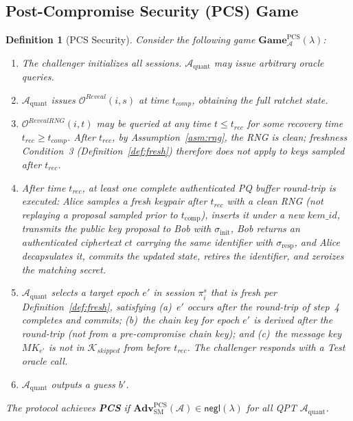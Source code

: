 \documentclass[11pt,a4paper]{article}
\newtheorem{definition}[theorem]{Definition}
\theoremstyle{remark}
\theoremstyle{plain}
\newcommand{\negl}{\mathsf{negl}}
\newcommand{\Adv}{\mathbf{Adv}}
\newcommand{\PGame}{\mathbf{Game}}
\newcommand{\calA}{\mathcal{A}}
\newcommand{\calO}{\mathcal{O}}
\begin{document}
\subsection{Post-Compromise Security (PCS) Game}

\begin{definition}[PCS Security]
\label{def:pcs}
Consider the following game $\PGame^{\mathrm{PCS}}_{\calA}(\lambda)$:
\begin{enumerate}
  \item The challenger initializes all sessions.  $\calA_{\mathrm{quant}}$ may issue arbitrary
        oracle queries.
  \item $\calA_{\mathrm{quant}}$ issues $\calO^{Reveal}(i, s)$ at time $t_{comp}$, obtaining
        the full ratchet state.
  \item $\calO^{RevealRNG}(i, t)$ may be queried at any time $t \leq t_{rec}$ for some
        recovery time $t_{rec} \geq t_{comp}$.  After $t_{rec}$, by Assumption~\ref{asm:rng},
        the RNG is clean; freshness Condition~3 (Definition~\ref{def:fresh}) therefore does not
        apply to keys sampled after $t_{rec}$.
  \item After time $t_{rec}$, at least one complete authenticated PQ buffer round-trip is
        executed: Alice samples a fresh keypair after $t_{rec}$ with a clean RNG (not replaying a proposal sampled prior to $t_{\mathrm{comp}}$), inserts it under a new $kem\_id$, transmits the
        public key proposal to Bob with $\sigma_{\mathrm{init}}$, Bob returns an authenticated ciphertext $ct$ carrying the same identifier with $\sigma_{\mathrm{resp}}$, and Alice
        decapsulates it, commits the updated state, retires the identifier, and zeroizes the matching secret.
  \item $\calA_{\mathrm{quant}}$ selects a target epoch $e'$ in session $\pi^s_i$ that is fresh per Definition~\ref{def:fresh}, satisfying
        (a)~$e'$ occurs after the round-trip of step~4 completes and commits; (b)~the chain key for epoch
        $e'$ is derived \emph{after} the round-trip (not from a pre-compromise chain key); and
        (c)~the message key $MK_{e'}$ is not in $\mathcal{K}_{skipped}$ from before $t_{rec}$.
        The challenger responds with a Test oracle call.
  \item $\calA_{\mathrm{quant}}$ outputs a guess $b'$.
\end{enumerate}
The protocol achieves \textbf{PCS} if $\Adv^{\mathrm{PCS}}_{\mathrm{SM}}(\calA) \in
\negl(\lambda)$ for all QPT $\calA_{\mathrm{quant}}$.
\end{definition}
\end{document}
